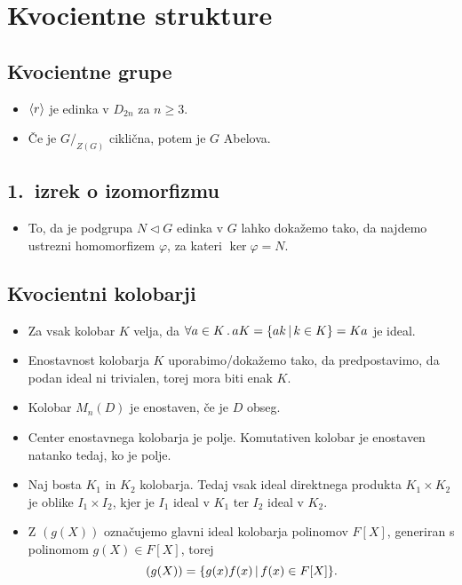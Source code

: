 \section{Kvocientne strukture}
\subsection{Kvocientne grupe}
\begin{itemize}
    \item \(\langle {r} \rangle\) je edinka v \(D_{2n}\) za \(n \geq 3\).
    \item Če je \(G/_{Z(G)}\) ciklična, potem je \(G\) Abelova.
\end{itemize}

\subsection{1.\ izrek o izomorfizmu}
\begin{itemize}
    \item To, da je podgrupa \(N \triangleleft G\) edinka v \(G\) lahko dokažemo tako, da najdemo ustrezni homomorfizem \(\varphi\), za kateri \(\ker \varphi = N\).
\end{itemize}

\subsection{Kvocientni kolobarji}
\begin{itemize}
    \item Za vsak kolobar \(K\) velja, da \(\forall a \in K \,.\, aK = \{ak \,|\, k \in K\} = Ka\) je ideal. 
    \item Enostavnost kolobarja \(K\) uporabimo/dokažemo tako, da predpostavimo, da podan ideal ni trivialen, torej mora biti enak \(K\).
    \item Kolobar \(M_n(D)\) je enostaven, če je \(D\) obseg.
    \item Center enostavnega kolobarja je polje. Komutativen kolobar je enostaven natanko tedaj, ko je polje.
    \item Naj bosta \(K_1\) in \(K_2\) kolobarja. Tedaj vsak ideal direktnega produkta \(K_1 \times K_2\) je oblike \(I_1 \times I_2\), kjer je \(I_1\) ideal v \(K_1\) ter \(I_2\) ideal v \(K_2\).
    \item Z \((g(X))\) označujemo glavni ideal kolobarja polinomov \(F[X]\), generiran s polinomom \(g(X) \in F[X]\), torej 
    \[
        (g(X)) = \{g(x)f(x) \,|\, f(x) \in F[X]\}.
    \]
\end{itemize}
